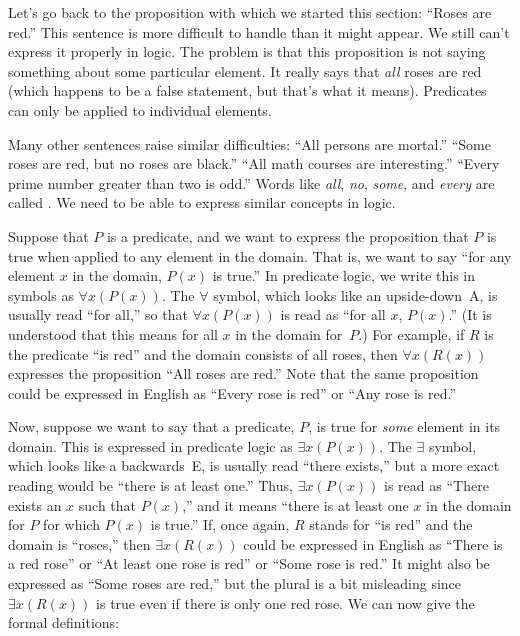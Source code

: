\medbreak
Let's go back to the proposition with which we started this section:
``Roses are red.''  This sentence is more difficult to handle than
it might appear.  We still can't express it properly in logic.
The problem is that this proposition is not saying something about
some particular element.  It really says that \emph{all} roses are red 
(which happens to be a false statement, but that's what it means).
Predicates can only be applied to individual elements.

Many other sentences raise similar difficulties:
``All persons are mortal.''  ``Some roses are red, but no roses are black.''
``All math courses are interesting.''  ``Every prime number greater than two
is odd.''  Words like \emph{all}, \emph{no}, \emph{some}, and \emph{every}
are called .  We need to be able to express similar concepts
in logic.

Suppose that $P$ is a predicate, and we want to express the proposition that
$P$ is true when applied to any element in the domain.
That is, we want to say ``for any element $x$ in the domain,
$P(x)$ is true.''  In predicate logic, we write this in symbols as
$\forall x(P(x))$.  The $\forall$ symbol, which looks like an
upside-down~A, is usually read ``for all,'' so that $\forall x(P(x))$
is read as ``for all $x$, $P(x)$.''  (It is understood that this means
for all $x$ in the domain for~$P$.)  For example,
if $R$ is the predicate ``is red'' and the domain consists
of all roses, then $\forall x(R(x))$ expresses the proposition
``All roses are red.''  Note that the same proposition could be
expressed in English as ``Every rose is red'' or ``Any rose is red.''
 
Now, suppose we want to say that a predicate, $P$, is true for \emph{some}
element in its domain.  This is expressed in predicate
logic as $\exists x(P(x))$.  The $\exists$ symbol, which looks like a
backwards~E, is usually read ``there exists,'' but a more exact reading
would be ``there is at least one.'' Thus, $\exists x(P(x))$ is read
as ``There exists an $x$ such that $P(x)$,'' and it means ``there is
at least one $x$ in the domain for $P$ for which $P(x)$
is true.''  If, once again, $R$ stands for ``is red'' and the domain
is ``roses,'' then $\exists x(R(x))$ could be expressed
in English as ``There is a red rose'' or ``At least one rose is red''
or ``Some rose is red.''  It might also be expressed as ``Some roses
are red,'' but the plural is a bit misleading since $\exists x(R(x))$
is true even if there is only one red rose.
We can now give the formal definitions:

